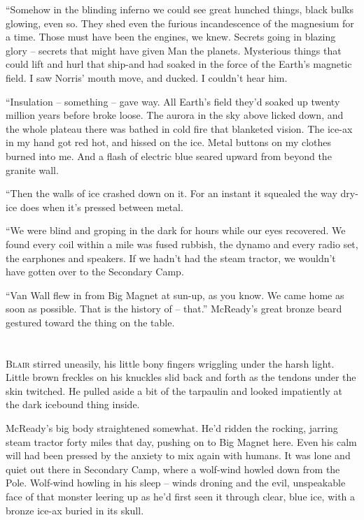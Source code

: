 \documentclass[letterpaper,openany,12pt]{memoir}		%
\begin{document}
``Somehow in the blinding inferno we could see great hunched things, black bulks
glowing, even so. They shed even the furious incandescence of the magnesium for
a time. Those must have been the engines, we knew. Secrets going in blazing
glory -- secrets that might have given Man the planets. Mysterious things that
could lift and hurl that ship-and had soaked in the force of the Earth's
magnetic field. I saw Norris' mouth move, and ducked. I couldn't hear him.

``Insulation -- something -- gave way. All Earth's field they'd soaked up twenty
million years before broke loose. The aurora in the sky above licked down, and
the whole plateau there was bathed in cold fire that blanketed vision. The
ice-ax in my hand got red hot, and hissed on the ice. Metal buttons on my
clothes burned into me. And a flash of electric blue seared upward from beyond
the granite wall.

``Then the walls of ice crashed down on it. For an instant it squealed the way
dry-ice does when it's pressed between metal.

``We were blind and groping in the dark for hours while our eyes recovered. We
found every coil within a mile was fused rubbish, the dynamo and every radio
set, the earphones and speakers. If we hadn't had the steam tractor, we wouldn't
have gotten over to the Secondary Camp.

``Van Wall flew in from Big Magnet at sun-up, as you know. We came home as soon
as possible. That is the history of -- that.'' McReady's great bronze beard
gestured toward the thing on the table.


\chapter[Chapter 2]{}

\lettrine[lines=3,findent=2pt,nindent=2pt]{B}{lair} stirred uneasily, his little
bony fingers wriggling under the harsh light. Little brown freckles on his
knuckles slid back and forth as the tendons under the skin twitched. He pulled
aside a bit of the tarpaulin and looked impatiently at the dark icebound thing
inside.

McReady's big body straightened somewhat. He'd ridden the rocking, jarring steam
tractor forty miles that day, pushing on to Big Magnet here. Even his calm will
had been pressed by the anxiety to mix again with humans. It was lone and quiet
out there in Secondary Camp, where a wolf-wind howled down from the Pole.
Wolf-wind howling in his sleep -- winds droning and the evil, unspeakable face
of that monster leering up as he'd first seen it through clear, blue ice, with a
bronze ice-ax buried in its skull.
\end{document}
